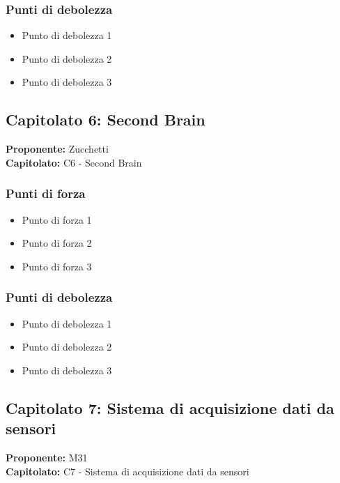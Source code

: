 \documentclass[a4paper,12pt]{article}
\begin{document}
\subsubsection{Punti di debolezza}
\begin{itemize}
\item Punto di debolezza 1
\item Punto di debolezza 2
\item Punto di debolezza 3
\end{itemize}

\subsection{Capitolato 6: Second Brain}

\begin{tcolorbox}[colback=lightgray!30,colframe=darkgray,arc=2mm,boxrule=0.3pt]
\textbf{Proponente:} Zucchetti \\
\textbf{Capitolato:} C6 - Second Brain
\end{tcolorbox}

\subsubsection{Punti di forza}
\begin{itemize}
\item Punto di forza 1
\item Punto di forza 2
\item Punto di forza 3
\end{itemize}

\subsubsection{Punti di debolezza}
\begin{itemize}
\item Punto di debolezza 1
\item Punto di debolezza 2
\item Punto di debolezza 3
\end{itemize}

\subsection{Capitolato 7: Sistema di acquisizione dati da sensori}

\begin{tcolorbox}[colback=lightgray!30,colframe=darkgray,arc=2mm,boxrule=0.3pt]
\textbf{Proponente:} M31 \\
\textbf{Capitolato:} C7 - Sistema di acquisizione dati da sensori
\end{tcolorbox}
\end{document}
